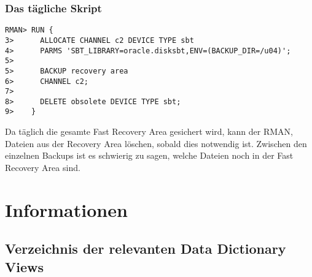         \subsubsection{Das t\"agliche Skript}
          \begin{lstlisting}[caption={Das t\"agliche Skript},label=admin1364,language=rman]
RMAN> RUN {
3>      ALLOCATE CHANNEL c2 DEVICE TYPE sbt
4>      PARMS 'SBT_LIBRARY=oracle.disksbt,ENV=(BACKUP_DIR=/u04)';
5>
5>      BACKUP recovery area
6>      CHANNEL c2;
7>
8>      DELETE obsolete DEVICE TYPE sbt;
9>    }
          \end{lstlisting}
          Da t\"aglich die gesamte Fast Recovery Area gesichert wird, kann der RMAN, Dateien aus der Recovery Area l\"oschen, sobald dies notwendig ist. Zwischen den einzelnen Backups ist es schwierig zu sagen, welche Dateien noch in der Fast Recovery Area sind.
    \section{Informationen}
      \subsection{Verzeichnis der relevanten Data Dictionary Views}
        \begin{literaturinternet}
          \item \cite{REFRN30022}
          \item \cite{REFRN30030}
        \end{literaturinternet}
\clearpage
